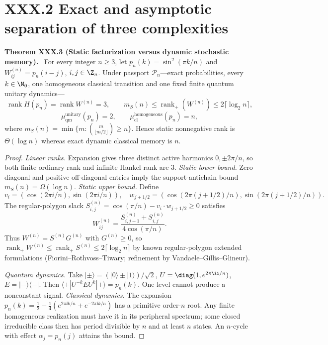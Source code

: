 \documentclass[11pt,a4paper,oneside]{book}
\DeclareMathOperator{\rank}{rank}\DeclareMathOperator{\Tr}{Tr}
\newcommand{\statement}[3]{\par\medskip\noindent\textbf{#1 #2 (#3).}\ }
\begin{document}
\section*{XXX.2 Exact and asymptotic separation of three complexities}
\statement{Theorem}{XXX.3}{Static factorization versus dynamic stochastic memory} For every integer $n\ge3$, let $p_n(k)=\sin^2(\pi k/n)$ and $W^{(n)}_{ij}=p_n(i-j)$, $i,j\in\Z_n$. Under passport $\mathcal P_n$---exact probabilities, every $k\in\N_0$, one homogeneous classical transition and one fixed finite quantum unitary dynamics---
\[\rank H(p_n)=\rank W^{(n)}=3,\qquad m_S(n)\le\rank_+(W^{(n)})\le2\lceil\log_2n\rceil,\]
\[\mu_{\mathrm{qm}}^{\mathrm{unitary}}(p_n)=2,\qquad\mu_{\mathrm{cl}}^{\mathrm{homogeneous}}(p_n)=n,\]
where $m_S(n)=\min\{m:\binom m{\lfloor m/2\rfloor}\ge n\}$. Hence static nonnegative rank is $\Theta(\log n)$ whereas exact dynamic classical memory is $n$.
\begin{proof}\textit{Linear ranks.} Expansion gives three distinct active harmonics $0,\pm2\pi/n$, so both finite ordinary rank and infinite Hankel rank are 3. \textit{Static lower bound.} Zero diagonal and positive off-diagonal entries imply the support-antichain bound $m_S(n)=\Omega(\log n)$. \textit{Static upper bound.} Define
\[v_i=(\cos(2\pi i/n),\sin(2\pi i/n)),\quad w_{j+1/2}=(\cos(2\pi(j+1/2)/n),\sin(2\pi(j+1/2)/n)).\]
The regular-polygon slack $S^{(n)}_{i,j}=\cos(\pi/n)-v_i\cdot w_{j+1/2}\ge0$ satisfies
\[W^{(n)}_{ij}=\frac{S^{(n)}_{i,j-1}+S^{(n)}_{i,j}}{4\cos(\pi/n)}.\]
Thus $W^{(n)}=S^{(n)}G^{(n)}$ with $G^{(n)}\ge0$, so $\rank_+W^{(n)}\le\rank_+S^{(n)}\le2\lceil\log_2n\rceil$ by known regular-polygon extended formulations (Fiorini--Rothvoss--Tiwary; refinement by Vandaele--Gillis--Glineur).

\textit{Quantum dynamics.} Take $|\pm\rangle=(|0\rangle\pm|1\rangle)/\sqrt2$, $U=\diag(1,e^{2\pi\ii/n})$, $E=|-\rangle\langle-|$. Then $\langle+|U^{-k}EU^k|+\rangle=p_n(k)$. One level cannot produce a nonconstant signal. \textit{Classical dynamics.} The expansion $p_n(k)=\frac12-\frac14(e^{2\pi\ii k/n}+e^{-2\pi\ii k/n})$ has a primitive order-$n$ root. Any finite homogeneous realization must have it in its peripheral spectrum; some closed irreducible class then has period divisible by $n$ and at least $n$ states. An $n$-cycle with effect $\alpha_j=p_n(j)$ attains the bound.\end{proof}
\end{document}
